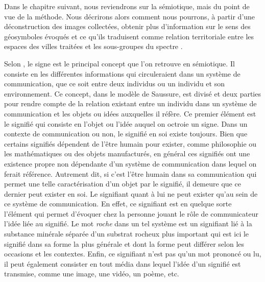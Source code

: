 Dans le chapitre suivant, nous reviendrons sur la sémiotique, mais du point de vue de la méthode. 
Nous décrirons alors comment nous pourrons, à partir d'une déconstruction des images collectées, obtenir plus d'information sur le sens des géosymboles évoqués et ce qu'ils traduisent comme relation territoriale entre les espaces des villes traitées et les sous-groupes du spectre \lgbt{}.

Selon \citet[113][]{Rose2012}, le signe est le principal concept que l'on retrouve en sémiotique. 
Il consiste en les différentes informations qui circuleraient dans un système de communication, que ce soit entre deux individus ou un individu et son environnement. 
Ce concept, dans le modèle de Saussure, est divisé et deux parties pour rendre compte de la relation existant entre un individu dans un système de communication et les objets ou idées auxquelles il réfère. 
Ce premier élément est le signifié qui consiste en l'objet ou l'idée auquel on octroie un signe. 
Dans un contexte de communication ou non, le signifié en soi existe toujours. 
Bien que certains signifiés dépendent de l'être humain pour exister, comme philosophie ou les mathématiques ou des objets manufacturés, en général ces signifiés ont une existence propre non dépendante d'un système de communication dans lequel on ferait référence. 
Autrement dit, si c'est l'être humain dans sa communication qui permet une telle caractérisation d'un objet par le signifié, il demeure que ce dernier peut exister en soi. 
Le signifiant quant à lui ne peut exister qu'au sein de ce système de communication. 
En effet, ce signifiant est en quelque sorte l'élément qui permet d'évoquer chez la personne jouant le rôle de communicateur l'idée liée au signifié. 
Le mot \emph{roche} dans un tel système est un signifiant lié à la substance minérale séparée d'un substrat rocheux plus important qui est ici le signifié dans sa forme la plus générale et dont la forme peut différer selon les occasions et les contextes. 
Enfin, ce signifiant n'est pas qu'un mot prononcé ou lu, il peut également consister en tout média dans lequel l'idée d'un signifié est transmise, comme une image, une vidéo, un poème, etc.

